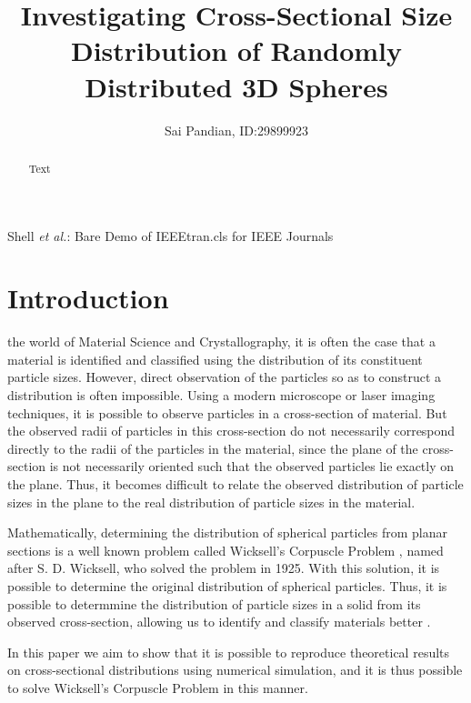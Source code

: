 \documentclass[journal]{IEEEtran}
\begin{document}
\title{Investigating Cross-Sectional Size Distribution of Randomly Distributed
       3D Spheres} 

\author{Sai Pandian, ID:\@ 29899923}%
        
{Shell \MakeLowercase{\textit{et al.}}: Bare Demo of IEEEtran.cls for IEEE Journals}

\maketitle

\begin{abstract}
  Text
\end{abstract}

\section{Introduction}

 the world of Material Science and Crystallography, it is
often the case that a material is identified and classified using the
distribution of its constituent particle sizes. However, direct observation of
the particles so as to construct a distribution is often impossible. Using a
modern microscope or laser imaging techniques, it is possible to observe
particles in a cross-section of material. But the observed radii of particles in
this cross-section do not necessarily correspond directly to the radii of the
particles in the material, since the plane of the cross-section is not
necessarily oriented such that the observed particles lie exactly on the
plane. Thus, it becomes difficult to relate the observed distribution of
particle sizes in the plane to the real distribution of particle sizes in the
material.

Mathematically, determining the distribution of spherical particles from planar
sections is a well known problem called Wicksell's Corpuscle Problem
, named after S. D. Wicksell, who solved the problem in 1925. With
this solution, it is possible to determine the original distribution of
spherical particles. Thus, it is possible to determmine the distribution of
particle sizes in a solid from its observed cross-section, allowing us to
identify and classify materials better .

In this paper we aim to show that it is possible to reproduce theoretical
results on cross-sectional distributions using numerical simulation, and it is
thus possible to solve Wicksell's Corpuscle Problem in this manner.
\end{document}
